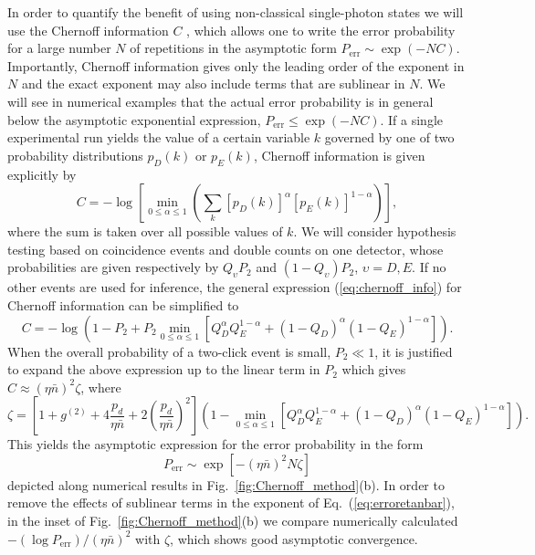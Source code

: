 \documentclass[10pt]{article}
\begin{document}
In order to quantify the benefit of using non-classical single-photon states we will use the Chernoff information $C$ \cite{CoverThomas}, which allows one to write the error probability for a large number $N$ of repetitions in the asymptotic form
$
P_{\textrm{err}}\sim \exp\left(-NC\right)
$.
Importantly, Chernoff information gives only the leading order of the exponent in $N$ and the exact exponent may also include terms that are sublinear in $N$. We will see in numerical examples that the actual error probability is in general below the asymptotic exponential expression, $P_{\textrm{err}}\leq \exp\left(-NC\right)$. If a single experimental run yields the value of a certain variable $k$ governed by one of two probability distributions $p_D(k)$ or $p_E(k)$, Chernoff information is given explicitly by
\begin{equation}
C=-\log\left[\min_{0 \le \alpha \le 1}\left(\sum_{k} [p_D(k)]^{\alpha}[p_E(k)]^{1-\alpha}\right)\right],\label{eq:chernoff_info}
\end{equation}
where the sum is taken over all possible values of $k$. We will consider hypothesis testing based on coincidence events and double counts on one detector, whose probabilities are given respectively by $Q_\upsilon P_2$ and $(1-Q_\upsilon) P_2$, $\upsilon = D,E$. If no other events are used for inference, the general expression (\ref{eq:chernoff_info}) for Chernoff information can be simplified to
\begin{equation}
C=-\log\left(1-P_{2} + P_2\min_{0 \le \alpha \le 1}[Q_{D}^{\alpha}Q_{E}^{1-\alpha}+(1-Q_{D})^{\alpha}(1-Q_{E})^{1-\alpha}]\right).
\end{equation}
When the overall probability of a two-click event is small, $P_{2}\ll1$, it is justified to expand the above expression  up to the linear term in $P_2$ which gives $ C \approx (\eta\bar{n})^2 \zeta$, where
\begin{equation}
\zeta=\left[1+g^{(2)}+4\frac{p_{d}}{\eta\bar{n}}+2\left(\frac{p_{d}}{\eta\bar{n}}\right)^{2}\right]
\left(1-\min_{0 \le \alpha \le 1}[Q_{D}^{\alpha}Q_{E}^{1-\alpha}+(1-Q_{D})^{\alpha}(1-Q_{E})^{1-\alpha}]\right).\label{eq:dzeta}
\end{equation}
This yields the asymptotic expression for the error probability in the form
\begin{equation}
P_{\text{err}}\sim\exp[-(\eta\bar{n})^{2}N \zeta ]
\label{eq:erroretanbar}
\end{equation}
depicted along numerical results in Fig.~\ref{fig:Chernoff_method}(b). In order to remove the effects of sublinear terms in the exponent of Eq.~(\ref{eq:erroretanbar}), in the inset of Fig.~\ref{fig:Chernoff_method}(b) we compare numerically calculated $-(\log P_{\text{err}})/(\eta\bar{n})^{2}$ with $\zeta$, which shows good asymptotic convergence.
\end{document}

